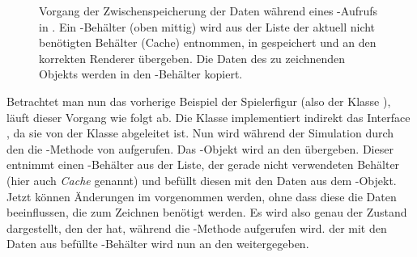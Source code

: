 \begin{figure}
	\centering
		\caption{Vorgang der Zwischenspeicherung der Daten während eines -Aufrufs in . Ein -Behälter (oben mittig) wird aus der Liste der aktuell nicht benötigten Behälter (Cache) entnommen, in  gespeichert und an den korrekten Renderer übergeben. Die Daten des zu zeichnenden Objekts werden in den -Behälter kopiert.}\label{fig:copyRenderable}
\end{figure}


Betrachtet man nun das vorherige Beispiel der Spielerfigur (also der Klasse ), läuft dieser Vorgang wie folgt ab. Die Klasse  implementiert indirekt das Interface , da sie von der Klasse  abgeleitet ist. Nun wird während der Simulation durch den  die -Methode von  aufgerufen. Das -Objekt wird an den  übergeben. Dieser entnimmt einen -Behälter aus der Liste, der gerade nicht verwendeten Behälter (hier auch \emph{Cache} genannt) und befüllt diesen mit den Daten aus dem -Objekt. Jetzt können Änderungen im  vorgenommen werden, ohne dass diese die Daten beeinflussen, die zum Zeichnen benötigt werden. Es wird also genau der Zustand dargestellt, den der  hat, während die -Methode aufgerufen wird. der mit den Daten aus  befüllte -Behälter wird nun an den  weitergegeben.


